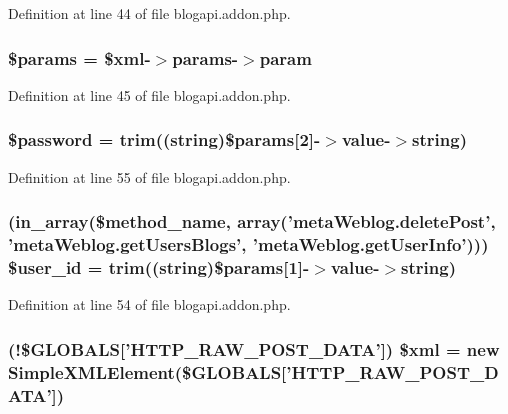 Definition at line 44 of file blogapi.\+addon.\+php.

\hypertarget{blogapi_8addon_8php_afe68e6fbe7acfbffc0af0c84a1996466}{
\subsubsection[{\$params}]{\setlength{\rightskip}{0pt plus 5cm}\$params = \$xml-\/$>$params-\/$>$param}}\label{blogapi_8addon_8php_afe68e6fbe7acfbffc0af0c84a1996466}


Definition at line 45 of file blogapi.\+addon.\+php.

\hypertarget{blogapi_8addon_8php_a607686ef9f99ea7c42f4f3dd3dbb2b0d}{
\subsubsection[{\$password}]{\setlength{\rightskip}{0pt plus 5cm}\$password = trim((string)\$params\mbox{[}2\mbox{]}-\/$>$value-\/$>$string)}}\label{blogapi_8addon_8php_a607686ef9f99ea7c42f4f3dd3dbb2b0d}


Definition at line 55 of file blogapi.\+addon.\+php.

\hypertarget{blogapi_8addon_8php_a6d0a036129b3030ce289a026c5e1eff2}{
\subsubsection[{\$user\+\_\+id}]{ (in\+\_\+array(\$method\+\_\+name, array('meta\+Weblog.\+delete\+Post', 'meta\+Weblog.\+get\+Users\+Blogs', 'meta\+Weblog.\+get\+User\+Info'))) \$user\+\_\+id = trim((string)\$params\mbox{[}1\mbox{]}-\/$>$value-\/$>$string)}}\label{blogapi_8addon_8php_a6d0a036129b3030ce289a026c5e1eff2}


Definition at line 54 of file blogapi.\+addon.\+php.

\hypertarget{blogapi_8addon_8php_a14ad998c59a6fcbcc09adbc67c7abb85}{
\subsubsection[{\$xml}]{ (!\$G\+L\+O\+B\+A\+L\+S\mbox{[}'H\+T\+T\+P\+\_\+\+R\+A\+W\+\_\+\+P\+O\+S\+T\+\_\+\+D\+A\+T\+A'\mbox{]}) \$xml = new Simple\+X\+M\+L\+Element(\$G\+L\+O\+B\+A\+L\+S\mbox{[}'H\+T\+T\+P\+\_\+\+R\+A\+W\+\_\+\+P\+O\+S\+T\+\_\+\+D\+A\+T\+A'\mbox{]})}}\label{blogapi_8addon_8php_a14ad998c59a6fcbcc09adbc67c7abb85}


